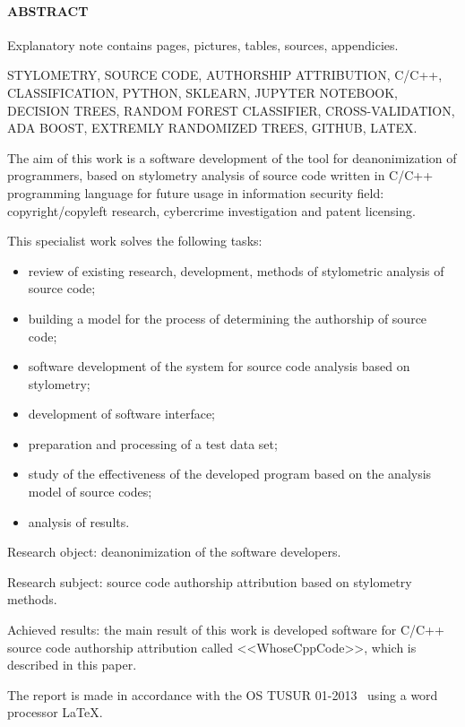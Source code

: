 \newpage
{}
\paragraph{\hfill ABSTRACT \hfill}
Explanatory note contains  pages,  pictures,  tables,
 sources,  appendicies.

STYLOMETRY, SOURCE CODE, AUTHORSHIP ATTRIBUTION, C/C++, CLASSIFICATION, PYTHON, SKLEARN,
JUPYTER NOTEBOOK, DECISION TREES, RANDOM FOREST CLASSIFIER, CROSS-VALIDATION, 
ADA BOOST, EXTREMLY RANDOMIZED TREES, GITHUB, LATEX.

The aim of this work is a software development of the tool for deanonimization of programmers, 
based on stylometry analysis of source code written in C/C++ programming language for future
usage in information security field: copyright/copyleft research, cybercrime investigation and patent licensing.

This specialist work solves the following tasks:
\begin{itemize}
  \item review of existing research, development, methods of stylometric analysis of source code;
  \item building a model for the process of determining the authorship of source code;
  \item software development of the system for source code analysis based on stylometry;
  \item development of software interface;
  \item preparation and processing of a test data set;
  \item study of the effectiveness of the developed program based on the analysis model of source codes;
  \item analysis of results.
\end{itemize}

Research object: deanonimization of the software developers.

Research subject: source code authorship attribution based on stylometry methods.

Achieved results: the main result of this work is developed software for C/C++ source code 
authorship attribution called <<WhoseCppCode>>, which is described in this paper.

The report is made in accordance with the OS TUSUR 01-2013~\cite{ostusur} using a word processor \LaTeX.
